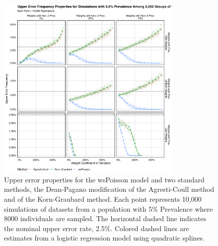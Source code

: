\documentclass[AMA,STIX1COL]{WileyNJD-v2}
\begin{document}
\begin{figure}
\centering
\includegraphics[width=0.8\textwidth]{figures/perfect_upper_error_frequency_8000_groups_0_05_prev.pdf}
\caption{Upper error properties for the wsPoisson model and two standard methods, the Dean-Pagano modification of the Agresti-Coull method and of the Korn-Graubard method.
Each point represents 10,000 simulations of datasets from a population with 5\% Prevalence where 8000 individuals are sampled.
The horizontal dashed line indicates the nominal upper error rate, 2.5\%.
Colored dashed lines are estimates from a logistic regression model using quadratic splines.}
\label{fig:perfect_upper_error_frequency_8000_groups_0_05_prev}
\end{figure}
\end{document}
